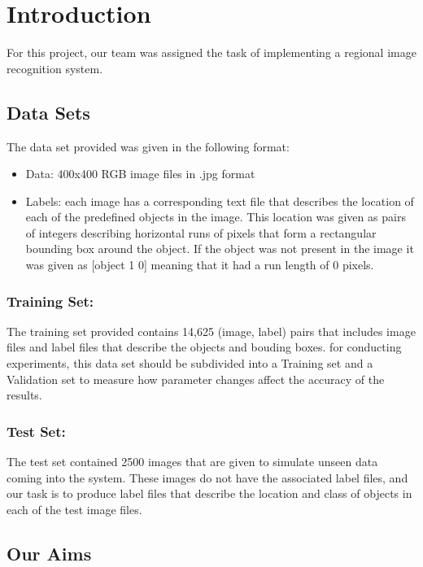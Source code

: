 \documentclass[11pt]{article}
\begin{document}
    \section{Introduction}\label{introduction}

For this project, our team was assigned the task of implementing a
regional image recognition system.

\subsection{Data Sets}\label{data-sets}

The data set provided was given in the following format:

\begin{itemize}
\item
  Data: 400x400 RGB image files in .jpg format
\item
  Labels: each image has a corresponding text file that describes the
  location of each of the predefined objects in the image. This location
  was given as pairs of integers describing horizontal runs of pixels
  that form a rectangular bounding box around the object. If the object
  was not present in the image it was given as {[}object 1 0{]} meaning
  that it had a run length of 0 pixels.
\end{itemize}

\subsubsection{Training Set:}\label{training-set}

The training set provided contains 14,625 (image, label) pairs that
includes image files and label files that describe the objects and
bouding boxes. for conducting experiments, this data set should be
subdivided into a Training set and a Validation set to measure how
parameter changes affect the accuracy of the results.

\subsubsection{Test Set:}\label{test-set}

The test set contained 2500 images that are given to simulate unseen
data coming into the system. These images do not have the associated
label files, and our task is to produce label files that describe the
location and class of objects in each of the test image files.

\subsection{Our Aims}\label{our-aims}
\end{document}
